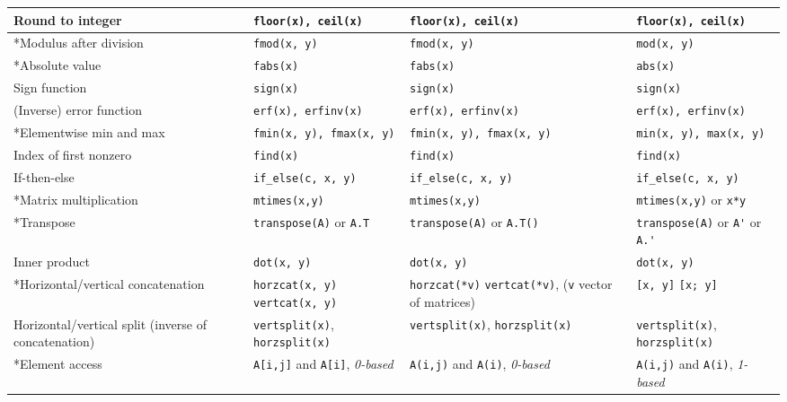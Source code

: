 \documentclass[a4paper,12pt]{book}
\begin{document}
\begin{center}
\begin{tabular}{| p{3.5cm} | p{3.5cm} | p{3.5cm} | p{3.5cm} | }
    Round to integer
    & \verb|floor(x), ceil(x)| & \verb|floor(x), ceil(x)| & \verb|floor(x), ceil(x)| \\ \hline
    *Modulus after division
    & \verb|fmod(x, y)| & \verb|fmod(x, y)| & \verb|mod(x, y)| \\ \hline
    *Absolute value
    & \verb|fabs(x)| & \verb|fabs(x)| & \verb|abs(x)| \\ \hline
    Sign function
    & \verb|sign(x)| & \verb|sign(x)| & \verb|sign(x)| \\ \hline
    (Inverse) error function
    & \verb|erf(x), erfinv(x)| & \verb|erf(x), erfinv(x)| & \verb|erf(x), erfinv(x)| \\ \hline
    *Elementwise min and max
    & \verb|fmin(x, y), fmax(x, y)| & \verb|fmin(x, y), fmax(x, y)| & \verb|min(x, y), max(x, y)| \\ \hline
    Index of first nonzero
    & \verb|find(x)| & \verb|find(x)| & \verb|find(x)| \\ \hline
    If-then-else
    & \verb|if_else(c, x, y)| & \verb|if_else(c, x, y)| & \verb|if_else(c, x, y)| \\ \hline
    *Matrix multiplication
    & \verb|mtimes(x,y)| & \verb|mtimes(x,y)| & \verb|mtimes(x,y)| or \verb|x*y| \\ \hline
    *Transpose
    & \verb|transpose(A)| or \verb|A.T| & \verb|transpose(A)| or \verb|A.T()|& \verb|transpose(A)| or \verb|A'| or \verb|A.'| \\ \hline
    Inner product
    & \verb|dot(x, y)| & \verb|dot(x, y)| & \verb|dot(x, y)| \\ \hline
    *Horizontal/vertical concatenation
    & \verb|horzcat(x, y)| \linebreak \verb|vertcat(x, y)|
    & \verb|horzcat(*v)| \verb|vertcat(*v)|, \linebreak (\verb|v| vector of matrices)
    & \verb|[x, y]| \linebreak \verb|[x; y]| \\ \hline
    Horizontal/vertical split (inverse of concatenation)
    & \verb|vertsplit(x)|, \verb|horzsplit(x)| & \verb|vertsplit(x)|, \verb|horzsplit(x)| & \verb|vertsplit(x)|, \verb|horzsplit(x)| \\ \hline
    *Element access
    & \verb|A[i,j]| and \verb|A[i]|, \linebreak \emph{0-based}
    & \verb|A(i,j)| and \verb|A(i)|, \linebreak \emph{0-based}
    & \verb|A(i,j)| and \verb|A(i)|, \linebreak \emph{1-based} \\ \hline

\end{tabular}
\end{center}
\end{document}
